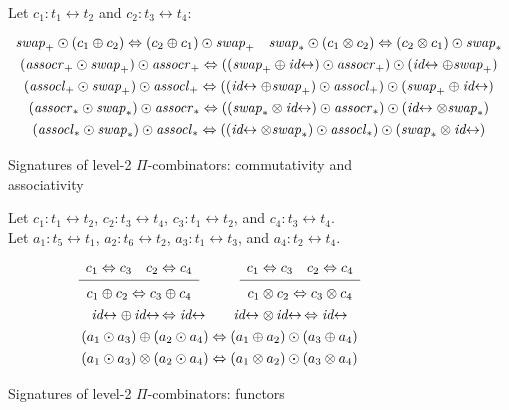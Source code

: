 \documentclass{article}
\newcommand{\swapp}{\mathit{swap}_+}
\newcommand{\assoclp}{\mathit{assocl}_+}
\newcommand{\assocrp}{\mathit{assocr}_+}
\newcommand{\swapt}{\mathit{swap}_*}
\newcommand{\assoclt}{\mathit{assocl}_*}
\newcommand{\assocrt}{\mathit{assocr}_*}
\newcommand{\idc}{\mathit{id}\!\!\leftrightarrow}
\newcommand{\Rule}[4]{
\makebox{{\rm #1}
$\displaystyle
\frac{\begin{array}{l}#2 \\\end{array}}
{\begin{array}{l}#3      \\\end{array}}$
 #4}}
\begin{document}
\begin{figure}[t]
Let $c_1 : t_1 \leftrightarrow t_2$ and $c_2 : t_3 \leftrightarrow t_4$:
\[\def\arraystretch{1.3}
\begin{array}{c}
  {\swapp \odot (c_1 \oplus c_2) \Leftrightarrow (c_2 \oplus c_1) \odot \swapp}
\quad
  {\swapt \odot (c_1 \otimes c_2) \Leftrightarrow (c_2 \otimes c_1) \odot \swapt}
\\
  {(\assocrp \odot \swapp) \odot \assocrp \Leftrightarrow ((\swapp \oplus \idc) \odot \assocrp) \odot (\idc \oplus \swapp)}
\\
  {(\assoclp \odot \swapp) \odot \assoclp \Leftrightarrow ((\idc \oplus \swapp) \odot \assoclp) \odot (\swapp \oplus \idc)}
\\
  {(\assocrt \odot \swapt) \odot \assocrt \Leftrightarrow ((\swapt \otimes \idc) \odot \assocrt) \odot (\idc \otimes \swapt)}
\\
  {(\assoclt \odot \swapt) \odot \assoclt \Leftrightarrow ((\idc \otimes \swapt) \odot \assoclt) \odot (\swapt \otimes \idc)}
\end{array}\]
\caption{\label{figf}Signatures of level-2 $\Pi$-combinators: commutativity and associativity}
\end{figure}

\begin{figure}[t]
Let $c_1 : t_1 \leftrightarrow t_2$, $c_2 : t_3 \leftrightarrow t_4$, $c_3 : t_1 \leftrightarrow t_2$, and $c_4 : t_3 \leftrightarrow t_4$. \\
Let $a_1 : t_5 \leftrightarrow t_1$,  $a_2 : t_6 \leftrightarrow t_2$, $a_3 : t_1 \leftrightarrow t_3$, and $a_4 : t_2 \leftrightarrow t_4$.
\[\def\arraystretch{1.3}
\begin{array}{c}
\Rule{}
  {c_1 \Leftrightarrow c_3 \quad c_2 \Leftrightarrow c_4}
  {c_1 \oplus c_2 \Leftrightarrow c_3 \oplus c_4}
  {}
\qquad
\Rule{}
  {c_1 \Leftrightarrow c_3 \quad c_2 \Leftrightarrow c_4}
  {c_1 \otimes c_2 \Leftrightarrow c_3 \otimes c_4}
  {}
\\
  {\idc \oplus \, \idc \, \Leftrightarrow \idc}
\qquad
  {\idc \otimes \, \idc \, \Leftrightarrow \idc}
\\
  {(a_1 \odot a_3) \oplus (a_2 \odot a_4) \Leftrightarrow (a_1 \oplus a_2) \odot (a_3 \oplus a_4)}
\\
  {(a_1 \odot a_3) \otimes (a_2 \odot a_4) \Leftrightarrow (a_1 \otimes a_2) \odot (a_3 \otimes a_4)}
\end{array}\]
\caption{\label{fige}Signatures of level-2 $\Pi$-combinators: functors}
\end{figure}
\end{document}
